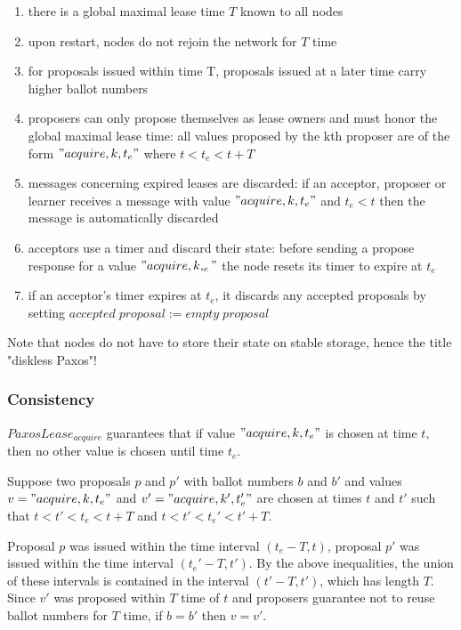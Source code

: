 \documentclass[12pt]{article}
\begin{document}
\begin{enumerate}
\item there is a global maximal lease time $T$ known to all nodes

\item upon restart, nodes do not rejoin the network for $T$ time

\item for proposals issued within time T, proposals issued at a later time carry higher ballot numbers


\item proposers can only propose themselves as lease owners and must honor the global maximal lease time: all values proposed by the kth proposer are of the form $"acquire, k, t_e"$ where $t < t_e < t + T$

\item messages concerning expired leases are discarded: if an acceptor, proposer or learner receives a message with value $"acquire, k, t_e"$ and $t_e < t$ then the message is automatically discarded

\item acceptors use a timer and discard their state: before sending a propose response for a value $"acquire, k, _e"$ the node resets its timer to expire at $t_e$

\item if an acceptor's timer expires at $t_e$, it discards any accepted proposals by setting $accepted \; proposal := empty \; proposal$

\end{enumerate}

Note that nodes do not have to store their state on stable storage, hence the title "diskless Paxos"!

\subsubsection{ Consistency } $PaxosLease_{acquire}$ guarantees that if value $"acquire, k, t_e"$ is chosen at time $t$, then no other value is chosen until time $t_e$.

Suppose two proposals $p$ and $p'$ with ballot numbers $b$ and $b'$ and values $v = "acquire, k, t_e"$ and $v' = "acquire, k', t_e'"$ are chosen at times $t$ and $t'$ such that $t < t' < t_e < t + T$ and $t < t' < t_e' < t' + T$.

Proposal $p$ was issued within the time interval $(t_e - T, t)$, proposal $p'$ was issued within the time interval $(t_e' - T, t')$. By the above inequalities, the union of these intervals is contained in the interval $(t' - T, t')$, which has length $T$. Since $v'$ was proposed within $T$ time of $t$ and proposers guarantee not to reuse ballot numbers for $T$ time, if $b = b'$ then $v = v'$.
\end{document}
